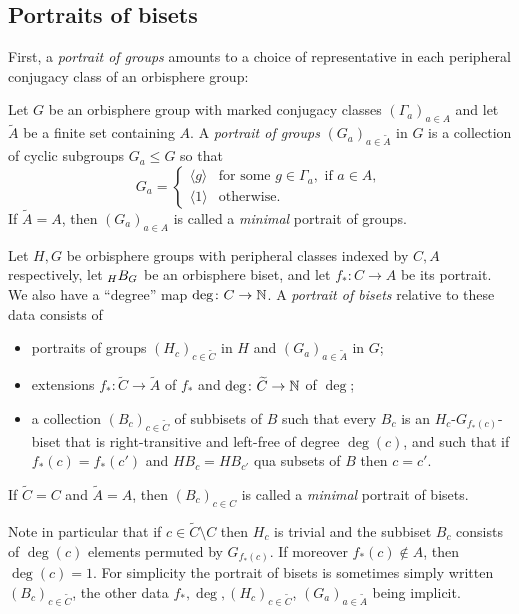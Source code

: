 \documentclass{amsart}
\newcommand\wtA{{\widetilde A}}
\newcommand\wtC{{\widetilde C}}
\begin{document}
\subsection{Portraits of bisets}
First, a \emph{portrait of groups} amounts to a choice of
representative in each peripheral conjugacy class of an orbisphere
group:
\begin{defn}
  Let $G$ be an orbisphere group with marked conjugacy classes
  $(\Gamma_a)_{a\in A}$ and let $\wtA$ be a finite set
  containing $A$. A \emph{portrait of groups}
  $(G_a)_{a\in\wtA}$ in $G$ is a collection of cyclic
  subgroups $G_a\le G$ so that
  \[G_a=\begin{cases} \langle g \rangle &\mbox{for some } g\in \Gamma_a, \mbox{ if } a\in A, \\
      \langle1 \rangle & \mbox{otherwise.}\end{cases}
  \]
  If $\wtA=A$, then $(G_a)_{a\in A}$ is called a
  \emph{minimal} portrait of groups.
\end{defn}

\begin{defn}\label{dfn:PrtrOfBst}
  Let $H,G$ be orbisphere groups with peripheral classes indexed by
  $C,A$ respectively, let $\subscript H B_G$ be an orbisphere biset,
  and let $f_*\colon C\to A$ be its portrait. We also have a
  ``degree'' map $\deg\colon C\to{\mathbb N}$.  A \emph{portrait of bisets}
  relative to these data consists of
  \begin{itemize}
  \item portraits of groups $(H_c)_{c\in\wtC}$ in $H$ and
    $(G_a)_{a\in\wtA}$ in $G$;
  \item extensions $f_*\colon\wtC\to\wtA$ of
    $f_*$ and $\deg\colon\wtC\to\N$ of $\deg$;
  \item a collection $(B_c)_{c\in\wtC}$ of subbisets of $B$
    such that every $B_c$ is an $H_c$-$G_{f_*(c)}$-biset that
    is right-transitive and left-free of degree $\deg(c)$, and such
    that if $f_*(c)=f_*(c')$ and $H B_c=H B_{c'}$
    qua subsets of $B$ then $c=c'$.
  \end{itemize}
  If $\wtC=C$ and $\wtA=A$, then $(B_c)_{c\in C}$ is
  called a \emph{minimal} portrait of bisets.
\end{defn}
Note in particular that if $c\in\wtC\setminus C$ then $H_c$ is
trivial and the subbiset $B_c$ consists of $\deg(c)$ elements permuted
by $G_{f_*(c)}$. If moreover $f_*(c)\notin A$, then $\deg(c)=1$. For
simplicity the portrait of bisets is sometimes simply written
$(B_c)_{c\in\wtC}$, the other data
$f_*,\deg,(H_c)_{c\in\wtC}$, $(G_a)_{a\in\wtA}$ being
implicit.
\end{document}
